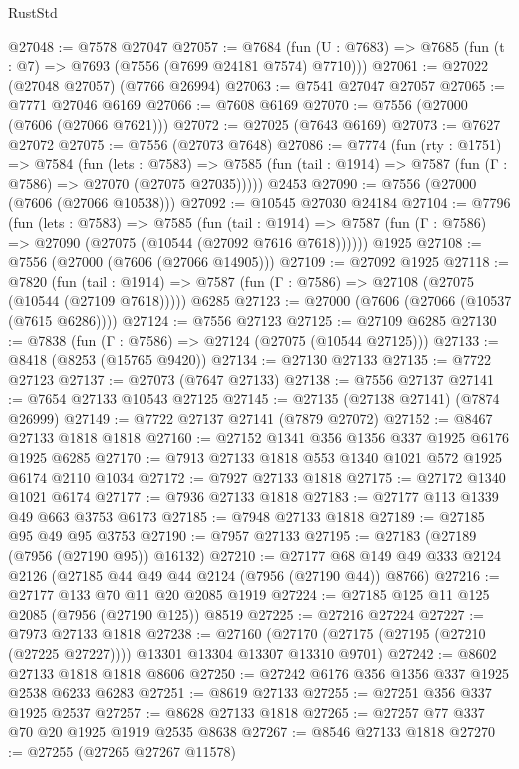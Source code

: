 \begin{lexlean}{RustStd}
\begin{coremodule}
@27048 := @7578 @27047
@27057 := @7684
    (fun (U : @7683) => @7685 (fun (t : @7) => @7693 (@7556 (@7699 @24181 @7574) @7710)))
@27061 := @27022 (@27048 @27057) (@7766 @26994)
@27063 := @7541 @27047 @27057
@27065 := @7771 @27046 @6169
@27066 := @7608 @6169
@27070 := @7556 (@27000 (@7606 (@27066 @7621)))
@27072 := @27025 (@7643 @6169)
@27073 := @7627 @27072
@27075 := @7556 (@27073 @7648)
@27086 := @7774
    (fun (rty : @1751) =>
    @7584
      (fun (lets : @7583) =>
      @7585 (fun (tail : @1914) => @7587 (fun (Γ : @7586) => @27070 (@27075 @27035)))))
    @2453
@27090 := @7556 (@27000 (@7606 (@27066 @10538)))
@27092 := @10545 @27030 @24184
@27104 := @7796
    (fun (lets : @7583) =>
    @7585
      (fun (tail : @1914) =>
      @7587 (fun (Γ : @7586) => @27090 (@27075 (@10544 (@27092 @7616 @7618))))))
    @1925
@27108 := @7556 (@27000 (@7606 (@27066 @14905)))
@27109 := @27092 @1925
@27118 := @7820
    (fun (tail : @1914) => @7587 (fun (Γ : @7586) => @27108 (@27075 (@10544 (@27109 @7618)))))
    @6285
@27123 := @27000 (@7606 (@27066 (@10537 (@7615 @6286))))
@27124 := @7556 @27123
@27125 := @27109 @6285
@27130 := @7838 (fun (Γ : @7586) => @27124 (@27075 (@10544 @27125)))
@27133 := @8418 (@8253 (@15765 @9420))
@27134 := @27130 @27133
@27135 := @7722 @27123
@27137 := @27073 (@7647 @27133)
@27138 := @7556 @27137
@27141 := @7654 @27133 @10543 @27125
@27145 := @27135 (@27138 @27141) (@7874 @26999)
@27149 := @7722 @27137 @27141 (@7879 @27072)
@27152 := @8467 @27133 @1818 @1818
@27160 := @27152 @1341 @356 @1356 @337 @1925 @6176 @1925 @6285
@27170 := @7913 @27133 @1818 @553 @1340 @1021 @572 @1925 @6174 @2110 @1034
@27172 := @7927 @27133 @1818
@27175 := @27172 @1340 @1021 @6174
@27177 := @7936 @27133 @1818
@27183 := @27177 @113 @1339 @49 @663 @3753 @6173
@27185 := @7948 @27133 @1818
@27189 := @27185 @95 @49 @95 @3753
@27190 := @7957 @27133
@27195 := @27183 (@27189 (@7956 (@27190 @95)) @16132)
@27210 := @27177 @68 @149 @49 @333 @2124 @2126 (@27185 @44 @49 @44 @2124 (@7956 (@27190 @44)) @8766)
@27216 := @27177 @133 @70 @11 @20 @2085 @1919
@27224 := @27185 @125 @11 @125 @2085 (@7956 (@27190 @125)) @8519
@27225 := @27216 @27224
@27227 := @7973 @27133 @1818
@27238 := @27160
    (@27170 (@27175 (@27195 (@27210 (@27225 @27227)))) @13301 @13304 @13307 @13310 @9701)
@27242 := @8602 @27133 @1818 @1818 @8606
@27250 := @27242 @6176 @356 @1356 @337 @1925 @2538 @6233 @6283
@27251 := @8619 @27133
@27255 := @27251 @356 @337 @1925 @2537
@27257 := @8628 @27133 @1818
@27265 := @27257 @77 @337 @70 @20 @1925 @1919 @2535 @8638
@27267 := @8546 @27133 @1818
@27270 := @27255 (@27265 @27267 @11578)

\end{coremodule}
\end{lexlean}
